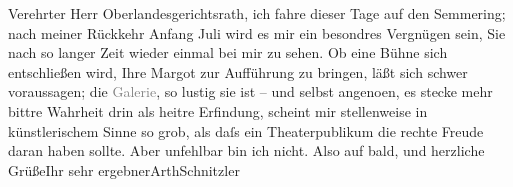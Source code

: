 \pstart{}Verehrter Herr Oberlandesgerichtsrath,\pend\vspace{0.5em}
\pstart
           ich fahre dieser Tage auf den Semmering; nach
               meiner Rückkehr Anfang Juli wird es mir ein besondres Vergnügen sein,
               Sie nach so langer Zeit wieder einmal bei mir zu sehen. Ob eine Bühne sich
               entschließen wird, Ihre Margot zur Aufführung zu
               bringen, läßt sich schwer voraussagen; die \textcolor{gray}{Galerie}, so lustig sie
               ist – und selbst angeno{\geminationm}en, es stecke mehr bittre
               Wahrheit drin als heitre Erfindung, scheint mir stellenweise in künstlerischem Sinne
               so grob, als daſs ein Theaterpublikum die rechte Freude daran haben sollte.\pend
           \pstart Aber unfehlbar bin ich nicht. Also auf bald, und herzliche Grüße\hspace*{1.5em}Ihr sehr ergebner\spacefill\mbox{ArthSchnitzler}\pend{}\endnumbering{}  \newcommand{\dateiname}{L02512}\newcommand{\titel}{Arthur Schnitzler an Robert Adam, 14. 6. 1929}\newcommand{\editorInnen}{Martin Anton Müller und Gerd-Hermann Susen}
